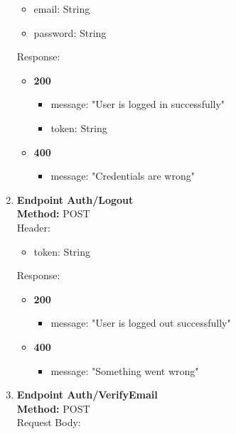 \begin{enumerate}
\begin{itemize}
        \item email: String
        \item password: String
    \end{itemize}
    Response:\\
    \begin{itemize}
        \item \textbf{200} \\
        \begin{itemize}
            \item message: "User is logged in successfully"
            \item token: String
        \end{itemize}
                \item \textbf{400} \\
        \begin{itemize}
            \item message: "Credentials are wrong"
        \end{itemize}
    \end{itemize}
    \item \textbf{Endpoint Auth/Logout} \\
    \textbf{Method:} POST \\
    Header:\\
    \begin{itemize}
        \item token: String
    \end{itemize}
    Response:\\
    \begin{itemize}
        \item \textbf{200} \\
        \begin{itemize}
            \item message: "User is logged out successfully"
        \end{itemize}
                \item \textbf{400} \\
        \begin{itemize}
            \item message: "Something went wrong"
        \end{itemize}
    \end{itemize}
    \item \textbf{Endpoint Auth/VerifyEmail} \\
    \textbf{Method:} POST \\
    Request Body:\\

\end{enumerate}
